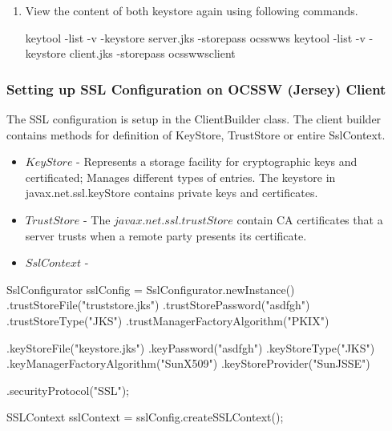 \documentclass[11pt, oneside]{article}   	%
\begin{document}
\begin{enumerate}
\item View the content of both keystore again using following commands.
\begin{code}
keytool -list -v -keystore server.jks -storepass ocsswws
keytool -list -v -keystore client.jks -storepass ocsswwsclient
\end{code}

\end{enumerate}

\subsubsection{\color{DeepPink4}Setting up SSL Configuration on OCSSW (Jersey) Client}
The SSL configuration is setup in the ClientBuilder class. The client builder contains methods for definition of KeyStore, TrustStore or entire SslContext.
\begin{itemize}
\item $KeyStore$ - Represents a storage facility for cryptographic keys and certificated; Manages different types of entries. The keystore in javax.net.ssl.keyStore contains  private keys and certificates.
\item $TrustStore$ -  The $javax.net.ssl.trustStore$ contain CA certificates that a server trusts when a remote party presents its certificate.
\item $SslContext$ -
\end{itemize}
\begin{code}
SslConfigurator sslConfig = SslConfigurator.newInstance()
    .trustStoreFile("truststore.jks")
    .trustStorePassword("asdfgh")
    .trustStoreType("JKS")
    .trustManagerFactoryAlgorithm("PKIX")

    .keyStoreFile("keystore.jks")
    .keyPassword("asdfgh")
    .keyStoreType("JKS")
    .keyManagerFactoryAlgorithm("SunX509")
    .keyStoreProvider("SunJSSE")

    .securityProtocol("SSL");

 SSLContext sslContext = sslConfig.createSSLContext();
\end{code}
\end{document}
